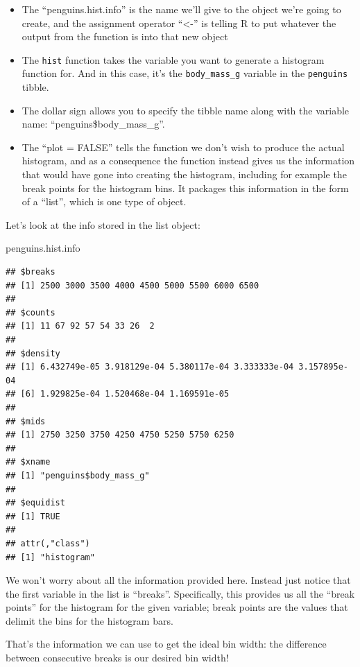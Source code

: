 \documentclass[
]{book}
\newenvironment{Shaded}{\begin{snugshade}}{\end{snugshade}}
\newcommand{\NormalTok}[1]{#1}
\providecommand{\tightlist}{%
  \setlength{\itemsep}{0pt}\setlength{\parskip}{0pt}}
\begin{document}
\begin{itemize}
\tightlist
\item
  The ``penguins.hist.info'' is the name we'll give to the object we're going to create, and the assignment operator ``\textless-'' is telling R to put whatever the output from the function is into that new object
\item
  The \texttt{hist} function takes the variable you want to generate a histogram function for. And in this case, it's the \texttt{body\_mass\_g} variable in the \texttt{penguins} tibble.
\item
  The dollar sign allows you to specify the tibble name along with the variable name: ``penguins\$body\_mass\_g''.
\item
  The ``plot = FALSE'' tells the function we don't wish to produce the actual histogram, and as a consequence the function instead gives us the information that would have gone into creating the histogram, including for example the break points for the histogram bins. It packages this information in the form of a ``list'', which is one type of object.
\end{itemize}

Let's look at the info stored in the list object:

\begin{Shaded}
\begin{Highlighting}[]
\NormalTok{penguins.hist.info}
\end{Highlighting}
\end{Shaded}

\begin{verbatim}
## $breaks
## [1] 2500 3000 3500 4000 4500 5000 5500 6000 6500
## 
## $counts
## [1] 11 67 92 57 54 33 26  2
## 
## $density
## [1] 6.432749e-05 3.918129e-04 5.380117e-04 3.333333e-04 3.157895e-04
## [6] 1.929825e-04 1.520468e-04 1.169591e-05
## 
## $mids
## [1] 2750 3250 3750 4250 4750 5250 5750 6250
## 
## $xname
## [1] "penguins$body_mass_g"
## 
## $equidist
## [1] TRUE
## 
## attr(,"class")
## [1] "histogram"
\end{verbatim}

We won't worry about all the information provided here. Instead just notice that the first variable in the list is ``breaks''. Specifically, this provides us all the ``break points'' for the histogram for the given variable; break points are the values that delimit the bins for the histogram bars.

That's the information we can use to get the ideal bin width: the difference between consecutive breaks is our desired bin width!
\end{document}
